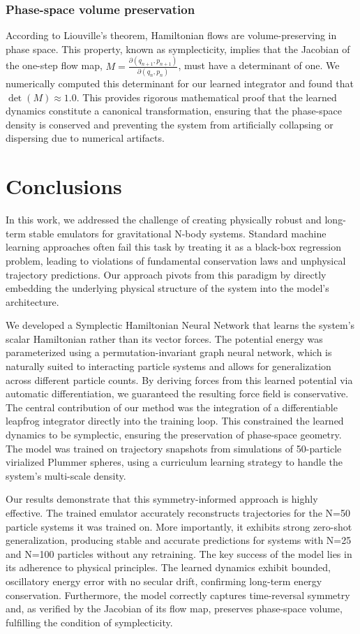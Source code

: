 \documentclass[]{article}
\begin{document}
\subsubsection{Phase-space volume preservation}

According to Liouville's theorem, Hamiltonian flows are volume-preserving in phase space. This property, known as symplecticity, implies that the Jacobian of the one-step flow map, $M = \frac{\partial(q_{n+1}, p_{n+1})}{\partial(q_n, p_n)}$, must have a determinant of one. We numerically computed this determinant for our learned integrator and found that $\det(M) \approx 1.0$. This provides rigorous mathematical proof that the learned dynamics constitute a canonical transformation, ensuring that the phase-space density is conserved and preventing the system from artificially collapsing or dispersing due to numerical artifacts.

\section{Conclusions}
\label{sec:conclusions}
In this work, we addressed the challenge of creating physically robust and long-term stable emulators for gravitational N-body systems. Standard machine learning approaches often fail this task by treating it as a black-box regression problem, leading to violations of fundamental conservation laws and unphysical trajectory predictions. Our approach pivots from this paradigm by directly embedding the underlying physical structure of the system into the model's architecture.

We developed a Symplectic Hamiltonian Neural Network that learns the system's scalar Hamiltonian rather than its vector forces. The potential energy was parameterized using a permutation-invariant graph neural network, which is naturally suited to interacting particle systems and allows for generalization across different particle counts. By deriving forces from this learned potential via automatic differentiation, we guaranteed the resulting force field is conservative. The central contribution of our method was the integration of a differentiable leapfrog integrator directly into the training loop. This constrained the learned dynamics to be symplectic, ensuring the preservation of phase-space geometry. The model was trained on trajectory snapshots from simulations of 50-particle virialized Plummer spheres, using a curriculum learning strategy to handle the system's multi-scale density.

Our results demonstrate that this symmetry-informed approach is highly effective. The trained emulator accurately reconstructs trajectories for the N=50 particle systems it was trained on. More importantly, it exhibits strong zero-shot generalization, producing stable and accurate predictions for systems with N=25 and N=100 particles without any retraining. The key success of the model lies in its adherence to physical principles. The learned dynamics exhibit bounded, oscillatory energy error with no secular drift, confirming long-term energy conservation. Furthermore, the model correctly captures time-reversal symmetry and, as verified by the Jacobian of its flow map, preserves phase-space volume, fulfilling the condition of symplecticity.
\end{document}
